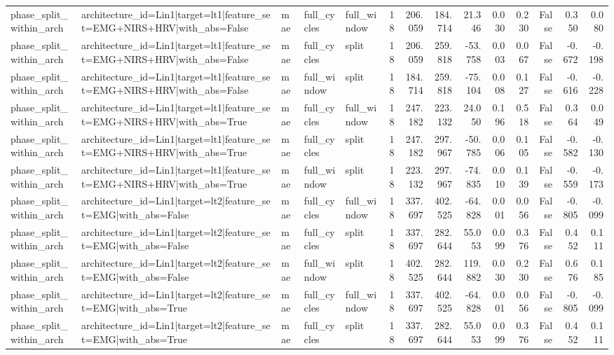 \begin{table}
\begin{tabular}{lllllrrrrrrrrr}
phase_split_within_arch & architecture_id=Lin1|target=lt1|feature_set=EMG+NIRS+HRV|with_abs=False & mae & full_cycles & full_window & 18 & 206.059 & 184.714 & 21.346 & 0.030 & 0.230 & False & 0.350 & 0.080 \\
phase_split_within_arch & architecture_id=Lin1|target=lt1|feature_set=EMG+NIRS+HRV|with_abs=False & mae & full_cycles & split & 18 & 206.059 & 259.818 & -53.758 & 0.003 & 0.067 & False & -0.672 & -0.198 \\
phase_split_within_arch & architecture_id=Lin1|target=lt1|feature_set=EMG+NIRS+HRV|with_abs=False & mae & full_window & split & 18 & 184.714 & 259.818 & -75.104 & 0.008 & 0.127 & False & -0.616 & -0.228 \\
phase_split_within_arch & architecture_id=Lin1|target=lt1|feature_set=EMG+NIRS+HRV|with_abs=True & mae & full_cycles & full_window & 18 & 247.182 & 223.132 & 24.050 & 0.196 & 0.518 & False & 0.364 & 0.049 \\
phase_split_within_arch & architecture_id=Lin1|target=lt1|feature_set=EMG+NIRS+HRV|with_abs=True & mae & full_cycles & split & 18 & 247.182 & 297.967 & -50.785 & 0.006 & 0.105 & False & -0.582 & -0.130 \\
phase_split_within_arch & architecture_id=Lin1|target=lt1|feature_set=EMG+NIRS+HRV|with_abs=True & mae & full_window & split & 18 & 223.132 & 297.967 & -74.835 & 0.010 & 0.139 & False & -0.559 & -0.173 \\
phase_split_within_arch & architecture_id=Lin1|target=lt2|feature_set=EMG|with_abs=False & mae & full_cycles & full_window & 18 & 337.697 & 402.525 & -64.828 & 0.001 & 0.056 & False & -0.805 & -0.099 \\
phase_split_within_arch & architecture_id=Lin1|target=lt2|feature_set=EMG|with_abs=False & mae & full_cycles & split & 18 & 337.697 & 282.644 & 55.053 & 0.099 & 0.376 & False & 0.452 & 0.111 \\
phase_split_within_arch & architecture_id=Lin1|target=lt2|feature_set=EMG|with_abs=False & mae & full_window & split & 18 & 402.525 & 282.644 & 119.882 & 0.030 & 0.230 & False & 0.676 & 0.185 \\
phase_split_within_arch & architecture_id=Lin1|target=lt2|feature_set=EMG|with_abs=True & mae & full_cycles & full_window & 18 & 337.697 & 402.525 & -64.828 & 0.001 & 0.056 & False & -0.805 & -0.099 \\
phase_split_within_arch & architecture_id=Lin1|target=lt2|feature_set=EMG|with_abs=True & mae & full_cycles & split & 18 & 337.697 & 282.644 & 55.053 & 0.099 & 0.376 & False & 0.452 & 0.111 \\

\end{tabular}
\end{table}
